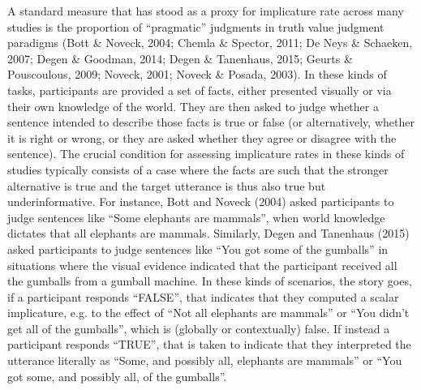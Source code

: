 \documentclass[man]{apa6}
\theoremstyle{definition}
\theoremstyle{definition}
\theoremstyle{definition}
\theoremstyle{remark}
\begin{document}
A standard measure that has stood as a proxy for implicature rate across
many studies is the proportion of \enquote{pragmatic} judgments in truth
value judgment paradigms (Bott \& Noveck, 2004; Chemla \& Spector, 2011;
De Neys \& Schaeken, 2007; Degen \& Goodman, 2014; Degen \& Tanenhaus,
2015; Geurts \& Pouscoulous, 2009; Noveck, 2001; Noveck \& Posada,
2003). In these kinds of tasks, participants are provided a set of
facts, either presented visually or via their own knowledge of the
world. They are then asked to judge whether a sentence intended to
describe those facts is true or false (or alternatively, whether it is
right or wrong, or they are asked whether they agree or disagree with
the sentence). The crucial condition for assessing implicature rates in
these kinds of studies typically consists of a case where the facts are
such that the stronger alternative is true and the target utterance is
thus also true but underinformative. For instance, Bott and Noveck
(2004) asked participants to judge sentences like \enquote{Some
elephants are mammals}, when world knowledge dictates that all elephants
are mammals. Similarly, Degen and Tanenhaus (2015) asked participants to
judge sentences like \enquote{You got some of the gumballs} in
situations where the visual evidence indicated that the participant
received all the gumballs from a gumball machine. In these kinds of
scenarios, the story goes, if a participant responds \enquote{FALSE},
that indicates that they computed a scalar implicature, e.g. to the effect
of \enquote{Not all elephants are mammals} or \enquote{You didn't get
all of the gumballs}, which is (globally or contextually) false. If
instead a participant responds \enquote{TRUE}, that is taken to indicate
that they interpreted the utterance literally as ``Some, and possibly
all, elephants are mammals'' or \enquote{You got some, and possibly all,
of the gumballs}.
\end{document}
